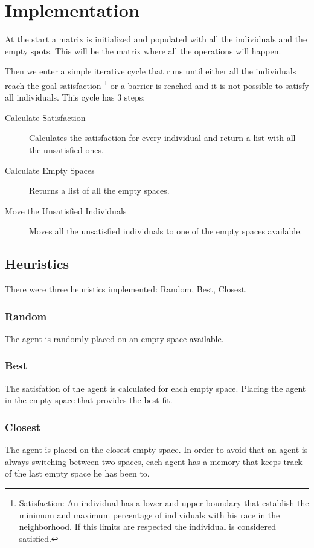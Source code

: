 \documentclass[a4paper,titlepage,11pt]{article}
\begin{document}
\newpage

\section{Implementation}
At the start a matrix is initialized and populated with all the individuals and the empty spots.
This will be the matrix where all the operations will happen.

Then we enter a simple iterative cycle that runs until either all the individuals reach the goal satisfaction
\footnote{Satisfaction: An individual has a lower and upper boundary that establish the minimum and maximum
percentage of individuals with his race in the neighborhood. If this limits are respected the individual is considered
satisfied.}
or a barrier is reached and it is not possible to satisfy all individuals. This cycle has 3 steps:

\begin{description}
\item [ Calculate Satisfaction ] Calculates the satisfaction for every individual and return a list with all the unsatisfied ones.
\item [ Calculate Empty Spaces ] Returns a list of all the empty spaces.
\item [ Move the Unsatisfied Individuals ] Moves all the unsatisfied individuals to one of the empty spaces available.
\end{description}

\subsection{Heuristics}
There were three heuristics implemented: Random, Best, Closest.

\subsubsection{Random}
The agent is randomly placed on an empty space available.

\subsubsection{Best}
The satisfation of the agent is calculated for each empty space.
Placing the agent in the empty space that provides the best fit.

\subsubsection{Closest}
The agent is placed on the closest empty space.
In order to avoid that an agent is always switching between two spaces,
each agent has a memory that keeps track of the last empty space he has been to.
\end{document}
